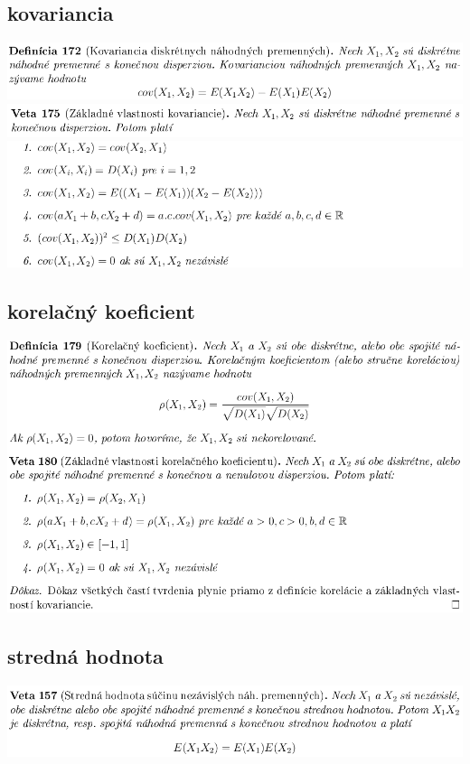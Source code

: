 \subsection {kovariancia}
\includegraphics[width=1\textwidth]{images/kovar}\\
\includegraphics[width=1\textwidth]{images/vlast_kovar}\\
\includegraphics[width=1\textwidth]{images/vlast_kovar_II}\\
\subsection {korelačný koeficient}
\includegraphics[width=1\textwidth]{images/korel_koef}\\
\subsection {stredná hodnota}
\includegraphics[width=1\textwidth]{images/stred_hod_nah_prem}\\
